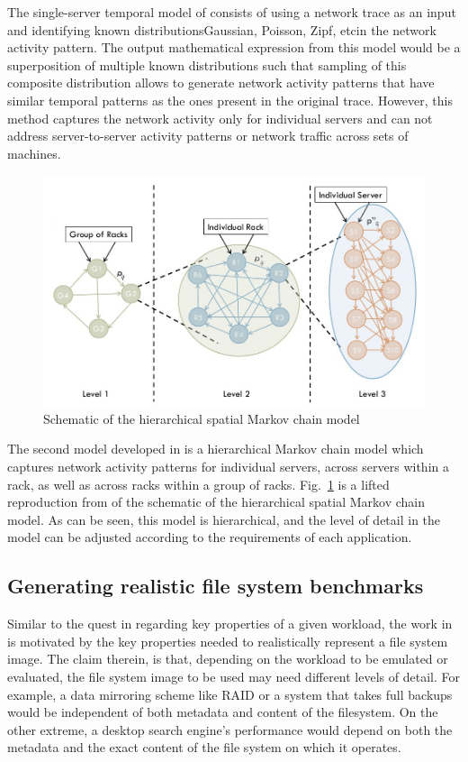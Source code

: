 The single-server temporal model of \cite{echo} consists of using
a network trace as an input and identifying known distributions\textemdash{}Gaussian,
Poisson, Zipf, etc\textemdash{}in the network activity pattern. The output 
mathematical expression from this model would be a superposition of
multiple known distributions such that sampling of this composite
distribution allows to generate network activity patterns that have
similar temporal patterns as the ones present in the original trace.
However, this method captures the network activity only for
individual servers and can not address server-to-server activity
patterns or network traffic across sets of machines.

\begin{figure}[t]
	\centering
	\includegraphics[scale=0.4]{presyn-figures/echo.jpg}
	\caption{Schematic of the hierarchical spatial Markov chain model~\cite{echo}}
	\label{fig:echo}
\end{figure}

The second model developed in \cite{echo} is a hierarchical Markov
chain model which captures network activity patterns for
individual servers, across servers within a rack, as well as
across racks within a group of racks. Fig.~\ref{fig:echo} is 
a lifted reproduction from \cite{echo} of the schematic of
the hierarchical spatial Markov chain model. 
As can be seen, this model is hierarchical, and 
the level of detail in the model can be adjusted according to the
requirements of each application.

\subsection{Generating realistic file system benchmarks}
Similar to the quest in \cite{distiller} regarding key properties 
of a given workload, the work in \cite{impressions} is motivated by
the key properties needed to realistically represent a file system
image. The claim therein, is that, depending on the workload to
be emulated or evaluated, the file system image to be used may
need different levels of detail. For example, a data mirroring
scheme like RAID or a system that takes full backups would be
independent of both metadata and content of the filesystem.
On the other extreme, a desktop search engine's performance
would depend on both the metadata and the exact content of
the file system on which it operates.

